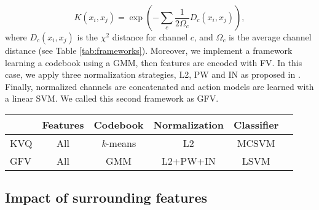 \begin{equation}
K(x_i,x_j)= \exp(-\sum_c {\frac{1}{2\Omega_c} D_c(x_i,x_j)}),
\label{eq:multichannel}
\end{equation}
where $D_c(x_i,x_j)$ is the $\chi^2$ distance for channel $c$, and $\Omega_c$ is the average channel distance (see Table \ref{tab:frameworks}). Moreover, we implement a framework learning a codebook using a GMM, then features are encoded with FV. In this case, we apply three normalization strategies, L2, PW and IN as proposed in \cite{xwang2013}. Finally, normalized channels are concatenated and action models are learned with a linear SVM. We called this second framework as GFV.

\begin{figure*}[t!]
\begin{center}
\fbox{\rule{0pt}{1in} \rule{0.9\linewidth}{0pt}}
\end{center}
\caption{Effect of feature sub-sampling when generating codebook.}
\label{fig:feature_sampling}
\end{figure*}

\begin{table*}[h!]
\caption{Comparison of adopted frameworks for action recognition.}
\begin{center}
{
\begin{tabular}{ l| c c c c c }
\hline
& Features & Codebook & Normalization & Classifier \\
\hline
KVQ & All & \textit{k}-means & L2 & MCSVM \\
GFV & All & GMM & L2+PW+IN & LSVM \\
\hline
\end{tabular}
}
\end{center}
\label{tab:frameworks}
\end{table*}

\subsection{Impact of surrounding features}

